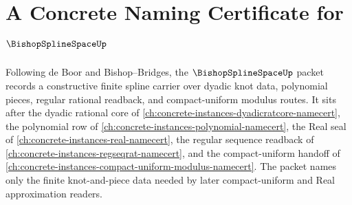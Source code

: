 \chapter{A Concrete Naming Certificate for $\BishopSplineSpaceUp$}
\label{ch:concrete-instances-bishop-spline-space-namecert}

Following de Boor and Bishop--Bridges, the $\BishopSplineSpaceUp$ packet records a constructive finite spline carrier over dyadic knot data, polynomial pieces, regular rational readback, and compact-uniform modulus routes. It sits after the dyadic rational core of \autoref{ch:concrete-instances-dyadicratcore-namecert}, the polynomial row of \autoref{ch:concrete-instances-polynomial-namecert}, the Real seal of \autoref{ch:concrete-instances-real-namecert}, the regular sequence readback of \autoref{ch:concrete-instances-regseqrat-namecert}, and the compact-uniform handoff of \autoref{ch:concrete-instances-compact-uniform-modulus-namecert}. The packet names only the finite knot-and-piece data needed by later compact-uniform and Real approximation readers.

